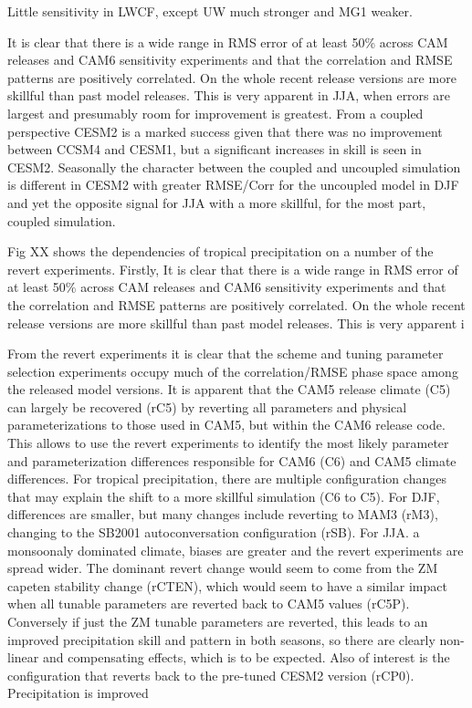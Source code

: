 Little sensitivity in LWCF, except UW much stronger and MG1 weaker.





It is clear that there is a wide range in RMS error of at least 50\% across CAM releases and CAM6 sensitivity experiments and that the correlation and RMSE patterns are positively correlated. On the whole recent release versions are more skillful than past model releases. This is very apparent in JJA, when errors are largest and presumably room for improvement is greatest. From a coupled perspective CESM2 is a marked success given that there was no improvement between CCSM4 and CESM1, but a significant increases in skill is seen in CESM2. Seasonally the character between the coupled and uncoupled simulation is different in CESM2 with greater RMSE/Corr for the uncoupled model in DJF and yet the opposite signal for JJA with a more skillful, for the most part, coupled simulation. 







Fig XX shows the dependencies of tropical precipitation on a number of the revert experiments. Firstly, It is clear that there is a wide range in RMS error of at least 50\% across CAM releases and CAM6 sensitivity experiments and that the correlation and RMSE patterns are positively correlated. On the whole recent release versions are more skillful than past model releases. This is very apparent i

From the revert experiments it is clear that the scheme and tuning parameter selection experiments occupy much of the correlation/RMSE phase space among the released model versions. It is apparent that the CAM5 release climate (C5) can largely be recovered (rC5) by reverting all parameters and physical parameterizations to those used in CAM5, but within the CAM6 release code. This allows to use the revert experiments to identify the most likely parameter and parameterization differences  responsible for CAM6 (C6) and CAM5 climate differences. For tropical precipitation, there are multiple configuration changes that may explain the shift to a more skillful simulation (C6 to C5). For DJF, differences are smaller, but many changes include reverting to MAM3 (rM3), changing to the SB2001 autoconversation configuration (rSB). For JJA. a monsoonaly dominated climate, biases are greater and the revert experiments are spread wider. The dominant revert change would seem to come from the ZM capeten stability change (rCTEN), which would seem to have a similar impact when all tunable parameters are reverted back to CAM5 values (rC5P). Conversely if just the ZM tunable parameters are reverted, this leads to an improved precipitation skill and pattern in both seasons, so there are clearly non-linear and compensating effects, which is to be expected. Also of interest is the configuration that reverts back to the pre-tuned CESM2 version (rCP0). Precipitation is improved



